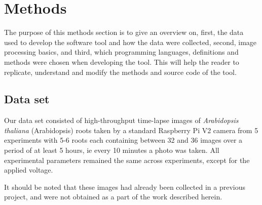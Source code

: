 
\chapter{Methods} %

\label{methods} %

%

The purpose of this methods section is to give an overview on, first, the data used to develop the software tool and how the data were collected, second, image processing basics, and third, which programming languages, definitions and methods were chosen when developing the tool. This will help the reader to replicate, understand and modify the methods and source code of the tool. 

\section{Data set}

Our data set consisted of high-throughput time-lapse images of \textit{Arabidopsis thaliana} (Arabidopsis) roots taken by a standard Raspberry Pi V2 camera from 5 experiments with 5-6 roots each containing between 32 and 36 images over a period of at least 5 hours, ie every 10 minutes a photo was taken. 
All experimental parameters remained the same across experiments, except for the applied voltage.

It should be noted that these images had already been collected in a previous project, and were not obtained as a part of the work described herein.


